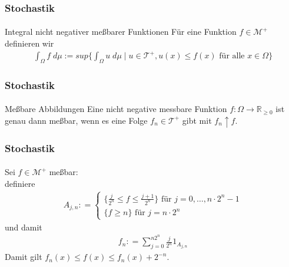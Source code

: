\documentclass{beamer}
\begin{document}
\begin{frame}
    \frametitle{Stochastik}
\framesubtitle{}
    \begin{block}{Integral nicht negativer meßbarer Funktionen}
        Für eine Funktion $f \in \mathcal{M}^+$ definieren wir
        \begin{align*}
            \int_{\Omega} f \;  d \mu := sup \biggl \{ \int_{\Omega} u \; d\mu \; | \; u \in \mathcal{T}^+, u(x) \leq f(x) \text{ für alle } x \in \Omega  \biggr  \}   
        \end{align*}
\end{block}
\end{frame}




\begin{frame} 
    \frametitle{Stochastik}
\framesubtitle{}
    \begin{block}{Meßbare Abbildungen}
        Eine nicht negative messbare Funktion $f:\Omega \to \mathbb{R}_{\geq 0}$ ist genau dann meßbar, wenn
        es eine Folge $f_n \in \mathcal{T}^+$ gibt mit $f_n \uparrow f$.
    \end{block}

\end{frame}


\begin{frame}
    \frametitle{Stochastik}
\framesubtitle{}
Sei  $f \in \mathcal{M}^+$ meßbar: \\
definiere
\begin{align*}
    A_{j,n} : = \begin{cases} 
        \{ \frac{j}{2^n} \leq f \leq \frac{j+1}{2^n} \} \text{ für } j= 0, \dots, n \cdot 2^n -1 \\
        \{  f \geq n \} \text{ für } j= n \cdot 2^n 
    \end{cases}
\end{align*}
und damit 
\begin{align*}
    f_n : =  \sum_{j= 0}^{n2^n} \frac{j}{2^n} 1_{A_{j,n}}
\end{align*}
Damit gilt $f_n(x) \leq f(x) \leq f_n(x) +2^{-n}$.
\end{frame}
\end{document}
